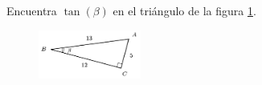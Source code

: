 \question[15] Encuentra $\tan(\beta)$ en el triángulo de la figura \ref{fig:functrig13}.
\begin{figure}[H]
    \begin{center}
        \includegraphics[width=0.3\textwidth]{../images/functrig13.png}
    \end{center}
    \caption{}
    \label{fig:functrig13}
\end{figure}
